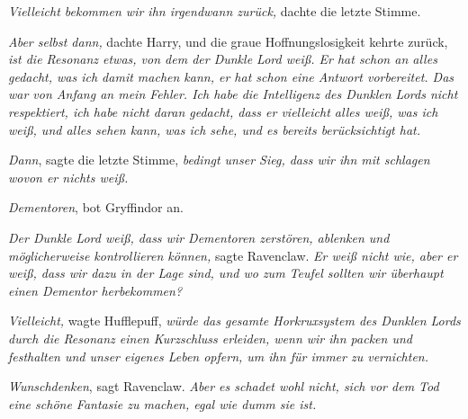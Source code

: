 \emph{Vielleicht bekommen wir ihn irgendwann zurück,} dachte die letzte Stimme.

\emph{Aber selbst dann,} dachte Harry, und die graue Hoffnungslosigkeit kehrte zurück, \emph{ist die Resonanz etwas, von dem der Dunkle Lord weiß. Er hat schon an alles gedacht, was ich damit machen kann, er hat schon eine Antwort vorbereitet. Das war von Anfang an mein Fehler. Ich habe die Intelligenz des Dunklen Lords nicht respektiert, ich habe nicht daran gedacht, dass er vielleicht alles weiß, was ich weiß, und alles sehen kann, was ich sehe, und es bereits berücksichtigt hat.}

\emph{Dann}, sagte die letzte Stimme, \emph{bedingt unser Sieg, dass wir ihn mit schlagen wovon er nichts weiß.}

\emph{Dementoren}, bot Gryffindor an.

\emph{Der Dunkle Lord \emph{weiß}, dass wir Dementoren zerstören, ablenken und möglicherweise kontrollieren können,} sagte Ravenclaw. \emph{Er weiß nicht wie, aber er weiß, dass wir dazu in der Lage sind, und wo zum Teufel sollten wir überhaupt einen Dementor herbekommen?}

\emph{Vielleicht,} wagte Hufflepuff, \emph{würde das gesamte Horkruxsystem des Dunklen Lords durch die Resonanz einen Kurzschluss erleiden, wenn wir ihn packen und festhalten und unser eigenes Leben opfern, um ihn für immer zu vernichten.}

\emph{Wunschdenken}, sagt Ravenclaw. \emph{Aber es schadet wohl nicht, sich vor dem Tod eine schöne Fantasie zu machen, egal wie dumm sie ist.}

